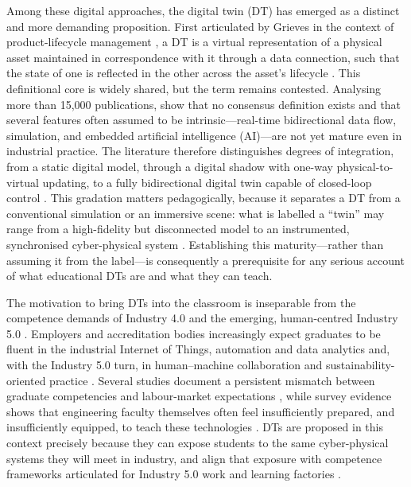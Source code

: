 Among these digital approaches, the digital twin (DT) has emerged as a distinct
and more demanding proposition. First articulated by Grieves in the
context of product-lifecycle management \citep[as reported in][]{liljaniemi_using_2020}, a DT is a virtual representation of a physical asset
maintained in correspondence with it through a data connection, such that the
state of one is reflected in the other across the asset's lifecycle
\citep{de_larmelina_conceptualizing_2026, weichbroth_toward_2024}. This definitional core is widely shared, but the term
remains contested. Analysing more than 15,000 publications, \citet{abdelrahman_what_2025} show that no consensus definition exists and that several features often
assumed to be intrinsic---real-time bidirectional data flow, simulation, and
embedded artificial intelligence (AI)---are not yet mature even in industrial
practice. The literature therefore distinguishes degrees of integration, from a
static digital model, through a digital shadow with one-way physical-to-virtual
updating, to a fully bidirectional digital twin capable of closed-loop control
\citep[Kritzinger et al., 2018, as cited in][]{liljaniemi_using_2020, abdelrahman_what_2025, bokhtiar_al_zami_digital_2025}. This gradation matters pedagogically, because it
separates a DT from a conventional simulation or an immersive scene: what is
labelled a ``twin'' may range from a high-fidelity but disconnected model to an
instrumented, synchronised cyber-physical system \citep{kabir_digital_2025, lee_digital_2025}. Establishing this maturity---rather than assuming it from the
label---is consequently a prerequisite for any serious account of what educational
DTs are and what they can teach.

The motivation to bring DTs into the classroom is inseparable from the competence
demands of Industry 4.0 and the emerging, human-centred Industry 5.0
\citep{saini_industry_2026, kabir_digital_2025}. Employers and accreditation bodies
increasingly expect graduates to be fluent in the industrial Internet of Things,
automation and data analytics and, with the Industry 5.0 turn, in human--machine
collaboration and sustainability-oriented practice \citep{sell_international_2025, azofeifa_top_2025, dautaj_importance_2026}. Several studies document a
persistent mismatch between graduate competencies and labour-market expectations
\citep{denissova_factors_2026}, while survey evidence shows that engineering faculty
themselves often feel insufficiently prepared, and insufficiently equipped, to
teach these technologies \citep{cuperman_academic_2026}. DTs are proposed in this
context precisely because they can expose students to the same
cyber-physical systems they will meet in industry, and align that exposure
with competence frameworks articulated for Industry 5.0 work and learning
factories \citep{zare_engineering_2026, nitu_engineering_2026, al-jumeily_implementing_2026}.

